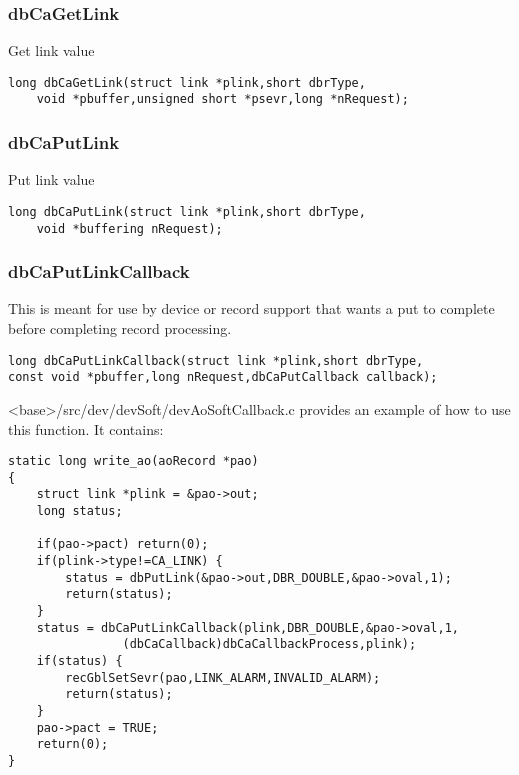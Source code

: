 \subsubsection{dbCaGetLink}

Get link value

\begin{verbatim}
long dbCaGetLink(struct link *plink,short dbrType,
    void *pbuffer,unsigned short *psevr,long *nRequest);
\end{verbatim}

\subsubsection{dbCaPutLink}

Put link value

\begin{verbatim}
long dbCaPutLink(struct link *plink,short dbrType,
    void *buffering nRequest);
\end{verbatim}

\subsubsection{dbCaPutLinkCallback}

This is meant for use by device or record support that wants a put to complete before completing record processing.

\begin{verbatim}
long dbCaPutLinkCallback(struct link *plink,short dbrType,
const void *pbuffer,long nRequest,dbCaPutCallback callback);
\end{verbatim}

\textless{}base\textgreater{}/src/dev/devSoft/devAoSoftCallback.c provides an example of how to use this function.
It contains:

\begin{verbatim}
static long write_ao(aoRecord *pao)
{
    struct link *plink = &pao->out;
    long status;

    if(pao->pact) return(0);
    if(plink->type!=CA_LINK) {
        status = dbPutLink(&pao->out,DBR_DOUBLE,&pao->oval,1);
        return(status);
    }
    status = dbCaPutLinkCallback(plink,DBR_DOUBLE,&pao->oval,1,
                (dbCaCallback)dbCaCallbackProcess,plink);
    if(status) {
        recGblSetSevr(pao,LINK_ALARM,INVALID_ALARM);
        return(status);
    }
    pao->pact = TRUE;
    return(0);
}
\end{verbatim}

